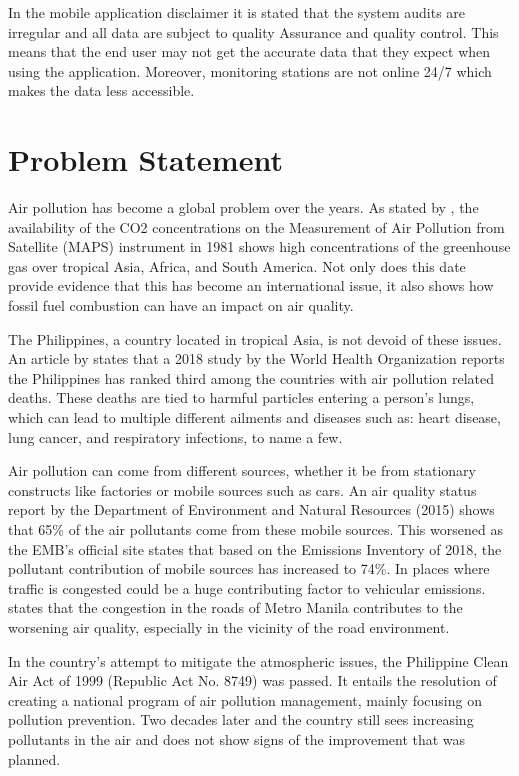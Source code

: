 In the mobile application disclaimer it is stated that the system audits are irregular and all data are subject to quality Assurance and quality control. This means that the end user may not get the accurate data that they expect when using the application. Moreover, monitoring stations are not online 24/7 which makes the data less accessible.


\section{Problem Statement}
	Air pollution has become a global problem over the years. As stated by \cite{Akimoto2004}, the availability of the CO2 concentrations on the Measurement of Air Pollution from Satellite (MAPS) instrument in 1981 shows high concentrations of the greenhouse gas over tropical Asia, Africa, and South America. Not only does this date provide evidence that this has become an international issue, it also shows how fossil fuel combustion can have an impact on air quality. 

The Philippines, a country located in tropical Asia, is not devoid of these issues. An article by \cite{abano_2019} states that a 2018 study by the World Health Organization reports the Philippines has ranked third among the countries with air pollution related deaths. These deaths are tied to harmful particles entering a person’s lungs, which can lead to multiple different ailments and diseases such as: heart disease, lung cancer, and respiratory infections, to name a few.

Air pollution can come from different sources, whether it be from stationary constructs like factories or mobile sources such as cars. \cite{EMB_2015}  An air quality status report by the Department of Environment and Natural Resources (2015) shows that 65\% of the air pollutants come from these mobile sources. This worsened as the EMB’s official site \cite{EMB_2018} states that based on the Emissions Inventory of 2018, the pollutant contribution of mobile sources has increased to  74\%. In places where traffic is congested could be a huge contributing factor to vehicular emissions. \cite{vergel_yai2000} states that the congestion in the roads of Metro Manila contributes to the worsening air quality, especially in the vicinity of the road environment.

In the country’s attempt to mitigate the atmospheric issues, the Philippine Clean Air Act of 1999 (Republic Act No. 8749) was passed. \cite{FAO} It entails the resolution of creating a national program of air pollution management, mainly focusing on pollution prevention. Two decades later and the country still sees increasing pollutants in the air and does not show signs of the improvement that was planned.

